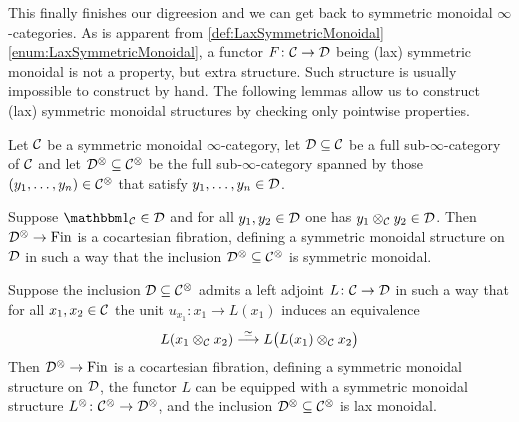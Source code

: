 This finally finishes our digreesion and we can get back to symmetric monoidal $\infty$-categories. As is apparent from \cref{def:LaxSymmetricMonoidal}\cref{enum:LaxSymmetricMonoidal}, a functor $F\colon \mathcal{C}\rightarrow \mathcal{D}$ being (lax) symmetric monoidal is not a property, but extra structure. Such structure is usually impossible to construct by hand. The following lemmas allow us to construct (lax) symmetric monoidal structures by checking only pointwise properties.
\begin{lem}\label{lem:SymmetricMonoidalSubcategory}
	Let $\mathcal{C}$ be a symmetric monoidal $\infty$-category, let $\mathcal{D}\subseteq \mathcal{C}$ be a full sub-$\infty$-category of  $\mathcal{C}$ and let $\mathcal{D}^\otimes\subseteq \mathcal{C}^\otimes$ be the full sub-$\infty$-category spanned by those $(y_1,\dotsc,y_n)\in \mathcal{C}^\otimes$ that satisfy $y_1,\dotsc,y_n\in \mathcal{D}$.
	\begin{alphanumerate}
		\item Suppose $\IUnit_\Cc\in\Dd$ and for all $y_1,y_2\in \mathcal{D}$ one has $y_1\otimes_{\mathcal{C}} y_2\in \mathcal{D}$. Then $\mathcal{D}^\otimes\rightarrow \mathrm{Fin}$ is a cocartesian fibration, defining a symmetric monoidal structure on $\mathcal{D}$ in such a way that the inclusion $\mathcal{D}^\otimes\subseteq \mathcal{C}^\otimes$ is symmetric monoidal.\label{enum:SymmetricMonoidalSubcategory}
		\item Suppose the inclusion $\mathcal{D}\subseteq \mathcal{C}^\otimes$ admits a left adjoint $L\colon \mathcal{C}\rightarrow \mathcal{D}$ in such a way that for all $x_1,x_2\in\mathcal{C}$ the unit $u_{x_1}\colon x_1\rightarrow L(x_1)$ induces an equivalence
		\begin{equation*}
			L(x_1\otimes_{\mathcal{C}} x_2)\overset{\simeq}{\longrightarrow} L\bigl(L(x_1)\otimes_{\mathcal{C}} x_2\bigr)
		\end{equation*}
		Then $\mathcal{D}^\otimes\rightarrow \mathrm{Fin}$ is a cocartesian fibration, defining a symmetric monoidal structure on $\mathcal{D}$, the functor $L$ can be equipped with a symmetric monoidal structure $L^\otimes\colon \mathcal{C}^\otimes\rightarrow \mathcal{D}^\otimes$, and the inclusion $\mathcal{D}^\otimes\subseteq \mathcal{C}^\otimes$ is lax monoidal.\label{enum:SymmetricMonoidalLocalisation}
	\end{alphanumerate}
\end{lem}
